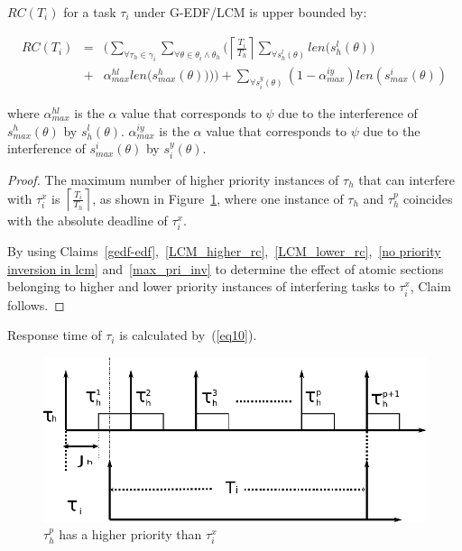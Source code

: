 \begin{clm}\label{GEDF/LCM response time}
$RC(T_i)$ for a task $\tau_i$ under G-EDF/LCM is upper bounded by:

\begin{eqnarray}
RC(T_i) & = & \Bigg(\sum_{\forall \tau_h \in \gamma_i}\sum_{\forall\theta \in \theta_i \wedge \theta_h}\Bigg(\left\lceil\frac{T_{i}}{T_{h}}\right\rceil\sum_{\forall s_{h}^{l}(\theta)}len\Big(s_{h}^{l}(\theta)\Big)\nonumber\\
& + & \alpha_{max}^{hl}len\Big(s_{max}^{h}(\theta)\Big)\Bigg)\Bigg) + \sum_{\forall s_{i}^{y}(\theta)}\left(1-\alpha_{max}^{iy}\right)len\left(s_{max}^i(\theta)\right)  
\label{eq78}\end{eqnarray}

where $\alpha_{max}^{hl}$ is the $\alpha$ value that corresponds to $\psi$ due to the interference of $s_{max}^h(\theta)$ by $s_h^l(\theta)$. $\alpha_{max}^{iy}$ is the $\alpha$ value that corresponds to $\psi$ due to the interference of $s_{max}^i(\theta)$ by $s_i^y(\theta)$.
\end{clm}

\begin{proof}\normalfont
The maximum number of higher priority instances of $\tau_h$ that can interfere with $\tau_i^x$ is $\left\lceil\frac{T_i}{T_h}\right\rceil$, as shown in Figure~\ref{fig17}, where one instance of $\tau_h$ and $\tau_h^p$ coincides with the absolute deadline of $\tau_i^x$.

By using Claims~\ref{gedf-edf},~\ref{LCM_higher_rc},~\ref{LCM_lower_rc},~\ref{no priority inversion in lcm} and~\ref{max_pri_inv} to determine the effect of atomic sections belonging to higher and lower priority instances of interfering tasks to $\tau_i^x$, Claim follows.
\end{proof}


Response time of $\tau_{i}$ is calculated by~(\ref{eq10}).
\begin{figure}
\begin{centering}
\includegraphics[scale=0.6]{figures/figure18}
\par\end{centering}
\caption{\label{fig17}$\tau_h^p$ has a higher priority than $\tau_i^x$}
\end{figure}

